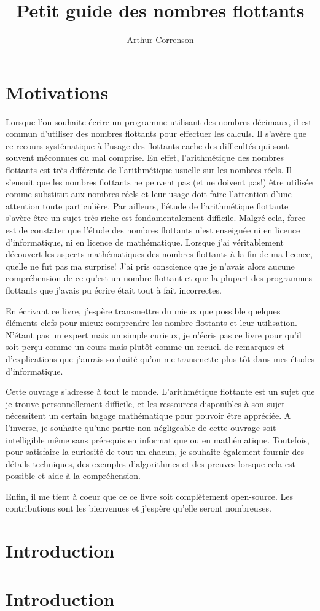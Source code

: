 \documentclass{book}
\begin{document}
  \title{Petit guide des nombres flottants}
  \author{Arthur Correnson}
  \maketitle
  \tableofcontents
  
  \chapter*{Motivations}

  Lorsque l'on souhaite écrire un programme utilisant des nombres décimaux, il est commun d'utiliser des nombres flottants pour effectuer les calculs. Il s'avère que ce recours systématique à l'usage des flottants cache des difficultés qui sont souvent méconnues ou mal comprise. En effet, l'arithmétique des nombres flottants est très différente de l'arithmétique usuelle sur les nombres réels. Il s'ensuit que les nombres flottants ne peuvent pas (et ne doivent pas!) être utilisée comme substitut aux nombres réels et leur usage doit faire l'attention d'une attention toute particulière. Par ailleurs, l'étude de l'arithmétique flottante s'avère être un sujet très riche est fondamentalement difficile. Malgré cela, force est de constater que l'étude des nombres flottants n'est enseignée ni en licence d'informatique, ni en licence de mathématique. Lorsque j'ai véritablement découvert les aspects mathématiques des nombres flottants à la fin de ma licence, quelle ne fut pas ma surprise! J'ai pris conscience que je n'avais alors aucune compréhension de ce qu'est un nombre flottant et que la plupart des programmes flottants que j'avais pu écrire était tout à fait incorrectes.

  En écrivant ce livre, j'espère transmettre du mieux que possible quelques éléments clefs pour mieux comprendre les nombre flottants et leur utilisation. N'étant pas un expert mais un simple curieux, je n'écris pas ce livre pour qu'il soit perçu comme un cours mais plutôt comme un recueil de remarques et d'explications que j'aurais souhaité qu'on me transmette plus tôt dans mes études d'informatique.

  Cette ouvrage s'adresse à tout le monde. L'arithmétique flottante est un sujet que je trouve personnellement difficile, et les ressources disponibles à son sujet nécessitent un certain bagage mathématique pour pouvoir être appréciée. A l'inverse, je souhaite qu'une partie non négligeable de cette ouvrage soit intelligible même sans prérequis en informatique ou en mathématique.
  Toutefois, pour satisfaire la curiosité de tout un chacun, je souhaite également fournir des détails techniques, des exemples d'algorithmes et des preuves lorsque cela est possible et aide à la compréhension.

  Enfin, il me tient à coeur que ce ce livre soit complètement open-source. Les contributions sont les bienvenues et j'espère qu'elle seront nombreuses.

  \chapter{Introduction}


  \chapter{Introduction}
\end{document}
